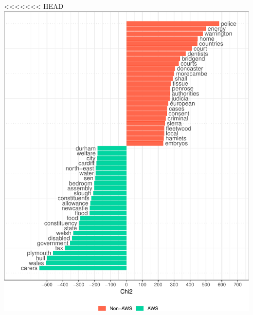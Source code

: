 \documentclass[]{article}
\let\origfigure\figure
\let\endorigfigure\endfigure
\renewenvironment{figure}[1][2] {
    \expandafter\origfigure\expandafter[H]
} {
    \endorigfigure
}
\theoremstyle{definition}
\theoremstyle{definition}
\theoremstyle{definition}
\theoremstyle{remark}
\begin{document}
\begin{table}[H]
\begin{table}[H]
\begin{table}[H]
\begin{table}[H]
\begin{table}[H]
\begin{table}[H]
\begin{table}[H]
\begin{table}[H]
\begin{figure}
\centering
<<<<<<< HEAD
\includegraphics{methodology_files/figure-latex/sl-keyness-1.pdf}
\caption{\label{fig:sl-keyness}Keyness between Female Labour MPs, by
=======
}
\end{figure}
\end{table}
\end{table}
\end{table}
\end{table}
\end{table}
\end{table}
\end{table}
\end{table}
\end{document}
